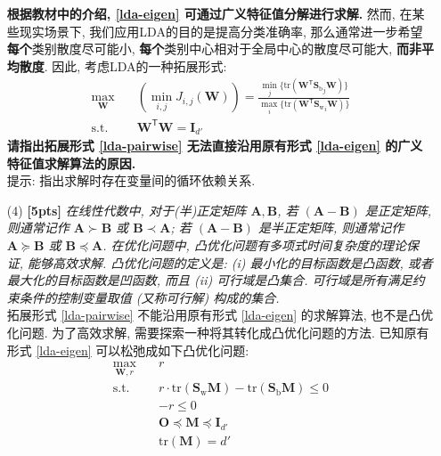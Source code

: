 \documentclass[a4paper]{article}
\numberwithin{equation}{section}
\theoremstyle{definition}
\def \transposed {\mathsf{T}}
\def \Sw {\mathbf{S}_{\mathrm{w}}}
\def \Sb {\mathbf{S}_{\mathrm{b}}}
\def \A {\mathbf{A}}
\def \B {\mathbf{B}}
\def \O {\mathbf{O}}
\def \I {\mathbf{I}}
\def \M {\mathbf{M}}
\def \W {\mathbf{W}}
\newcommand\sbr[1]{\left( #1 \right)}
\newcommand\tr[1]{\mathrm{tr}\sbr{#1}}
\begin{document}
\begin{enumerate}
	      \textbf{根据教材中的介绍, \eqref{lda-eigen} 可通过广义特征值分解进行求解.} 然而, 在某些现实场景下, 我们应用LDA的目的是提高分类准确率, 那么通常进一步希望\textbf{每个}类别散度尽可能小, \textbf{每个}类别中心相对于全局中心的散度尽可能大, \textbf{而非平均散度}. 因此, 考虑LDA的一种拓展形式:
	      \begin{equation}
		      \begin{aligned}
			      \max_{\W} \quad     & \sbr{\min_{i,j} J_{i,j}(\W)} = \frac{\min_{j} \{ \tr{\W^\transposed {\Sb}_j \W} \}}{\max_{i} \{ \tr{\W^\transposed {\Sw}_i \W} \}} \\
			      \mathrm{s.t.} \quad & \W^\transposed \W = \I_{d'}
		      \end{aligned}
		      \label{lda-pairwise}
	      \end{equation}
	      \textbf{请指出拓展形式 \eqref{lda-pairwise} 无法直接沿用原有形式 \eqref{lda-eigen} 的广义特征值求解算法的原因.} \\
	      提示: 指出求解时存在变量间的循环依赖关系.
	\item[(4)] \textbf{[5pts]} \textit{在线性代数中, 对于(半)正定矩阵 $\A, \B$, 若 $\sbr{\A-\B}$ 是正定矩阵, 则通常记作 $\A \succ \B$ 或 $\B \prec \A$; 若 $\sbr{\A-\B}$ 是半正定矩阵, 则通常记作 $\A \succcurlyeq \B$ 或 $\B \preccurlyeq \A$. 在优化问题中, 凸优化问题有多项式时间复杂度的理论保证, 能够高效求解. 凸优化问题的定义是: (i) 最小化的目标函数是凸函数, 或者最大化的目标函数是凹函数, 而且 (ii) 可行域是凸集合. 可行域是所有满足约束条件的控制变量取值 (又称可行解) 构成的集合.} \\
	      拓展形式 \eqref{lda-pairwise} 不能沿用原有形式 \eqref{lda-eigen} 的求解算法, 也不是凸优化问题. 为了高效求解, 需要探索一种将其转化成凸优化问题的方法. 已知原有形式 \eqref{lda-eigen} 可以松弛成如下凸优化问题:
	      \begin{equation}
		      \begin{aligned}
			      \max_{\W,r} \quad   & r                                             \\
			      \mathrm{s.t.} \quad & r \cdot \tr{\Sw \M} - \tr{\Sb \M} \leqslant 0 \\
			      \quad               & -r \leqslant 0                                \\
			      \quad               & \O \preccurlyeq \M \preccurlyeq \I_{d'}       \\
			      \quad               & \tr{\M} = d'                                  \\
		      \end{aligned}

\end{equation}
\end{enumerate}
\end{document}
